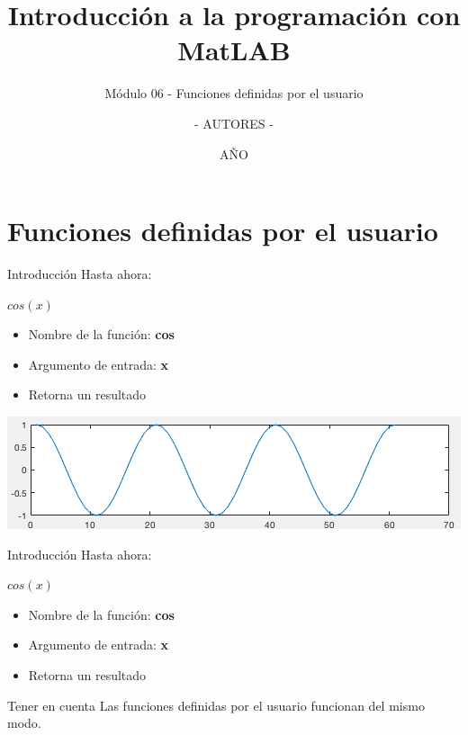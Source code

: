 \documentclass{bredelebeamer}
\title[Programación en MatLAB]{Introducción a la programación con MatLAB}
\subtitle{Módulo 06 - Funciones definidas por el usuario}
\author{- AUTORES - \inst{1}}
\institute[UNIVERSIDAD]
{
  \inst{1}%
  - NOMBRE UNIVERSIDAD - 
  }
\date{AÑO}
\begin{document}
\begin{frame}
  \titlepage 
\end{frame}




\section{Funciones definidas por el usuario}

\begin{frame}{Introducción}
Hasta ahora:
\begin{center}
$cos(x)$
\end{center}
\begin{itemize}
\item Nombre de la función: \textbf{cos}
\item Argumento de entrada: \textbf{x}
\item Retorna un resultado\\
\end{itemize}
\begin{center}
\includegraphics[scale=0.5]{images/img43.png}
\end{center}
\end{frame}

\begin{frame}{Introducción}
Hasta ahora:
\begin{center}
$cos(x)$
\end{center}
\begin{itemize}
\item Nombre de la función: \textbf{cos}
\item Argumento de entrada: \textbf{x}
\item Retorna un resultado\\
\end{itemize}
\begin{block}{Tener en cuenta}
Las funciones definidas por el usuario funcionan del mismo modo.
\end{block}
\end{frame}
\end{document}

